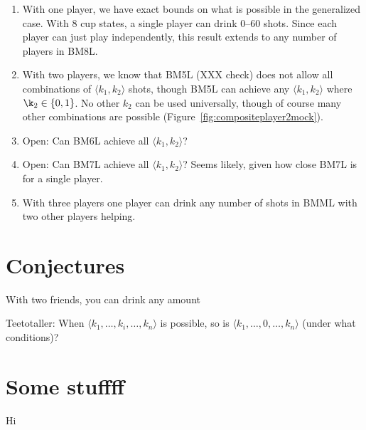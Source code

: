 \documentclass[twocolumn]{article}
\begin{document}
\begin{enumerate}
  \item With one player, we have exact bounds on what is possible in
    the generalized case. With 8 cup states, a single player can
    drink 0--60 shots. Since each player can just play independently,
    this result extends to any number of players in BM8L.
  \item With two players, we know that BM5L (XXX check) does not allow
    all combinations of $\langle k_1, k_2 \rangle$ shots, though BM5L
    can achieve any $\langle k_1, k_2 \rangle$ where $\k_2 \in \{ 0, 1
    \}$. No other $k_2$ can be used universally, though of course many
    other combinations are possible
    (Figure~\ref{fig:compositeplayer2mock}).
  \item Open: Can BM6L achieve all $\langle k_1, k_2 \rangle$?
  \item Open: Can BM7L achieve all $\langle k_1, k_2 \rangle$? Seems
    likely, given how close BM7L is for a single player.
  \item With three players one player can drink any number of shots in
    BMML with two other players helping.
\end{enumerate}

\section{Conjectures} \label{sec:conjectures}

With two friends, you can drink any amount

Teetotaller: When $\langle k_1, \ldots, k_i, \ldots, k_n \rangle$ is possible,
so is $\langle k_1, \ldots, 0, \ldots, k_n \rangle$ (under what conditions)?

\section{Some stuffff}

Hi




{}

\end{document}
